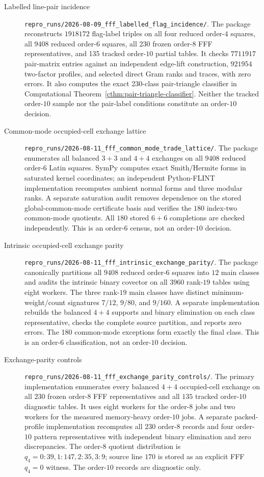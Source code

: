 \begin{description}
\item[Labelled line-pair incidence]
\nolinkurl{repro_runs/2026-08-09_fff_labelled_flag_incidence/}.
The package reconstructs $1918172$ flag-label triples on all four reduced
order-$4$ squares, all $9408$ reduced order-$6$ squares, all 230 frozen
order-$8$ FFF representatives, and 135 tracked order-$10$ partial tables.
It checks $7711917$ pair-matrix entries against an independent edge-lift
construction, $921954$ two-factor profiles, and selected direct Gram ranks
and traces, with zero errors.  It also computes the exact 230-class
pair-triangle classifier in Computational
Theorem~\ref{cthm:pair-triangle-classifier}.  Neither the tracked order-$10$
sample nor the pair-label conditions constitute an order-$10$ decision.

\item[Common-mode occupied-cell exchange lattice]
\nolinkurl{repro_runs/2026-08-11_fff_common_mode_trade_lattice/}.
The package enumerates all balanced $3+3$ and $4+4$ exchanges on all $9408$
reduced order-$6$ Latin squares.  SymPy computes exact Smith/Hermite forms in
saturated kernel coordinates; an independent Python-FLINT implementation
recomputes ambient normal forms and three modular ranks.  A separate
saturation audit removes dependence on the stored global-common-mode
certificate basis and
verifies the $180$ index-two common-mode quotients.  All $180$ stored
$6+6$ completions are checked independently.  This is an order-$6$ census,
not an order-$10$ decision.

\item[Intrinsic occupied-cell exchange parity]
\nolinkurl{repro_runs/2026-08-11_fff_intrinsic_exchange_parity/}.
The package canonically partitions all $9408$ reduced order-$6$ squares into
$12$ main classes and audits the intrinsic binary covector on all $3960$
rank-$19$ tables using eight workers.  The three rank-$19$ main classes have
distinct minimum-weight/count signatures $7/12$, $9/80$, and $9/160$.  A
separate implementation rebuilds the balanced $4+4$ supports and binary
elimination on each class representative, checks the complete source
partition, and reports zero errors.  The 180 common-mode exceptions form
exactly the final class.  This is an order-$6$ classification, not an
order-$10$ decision.

\item[Exchange-parity controls]
\nolinkurl{repro_runs/2026-08-11_fff_exchange_parity_controls/}.
The primary implementation enumerates every balanced $4+4$ occupied-cell
exchange on all $230$ frozen order-$8$ FFF representatives and all $135$
tracked order-$10$ diagnostic tables.  It uses eight workers for the
order-$8$ jobs and two workers for the measured memory-heavy order-$10$ jobs.
A separate packed-profile implementation recomputes all $230$ order-$8$
records and four order-$10$ pattern representatives with independent binary
elimination and zero discrepancies.  The order-$8$ quotient distribution is
$q_4=0:39,1:147,2:35,3:9$; source line $170$ is stored as an explicit FFF
$q_4=0$ witness.  The order-$10$ records are diagnostic only.


\end{description}
